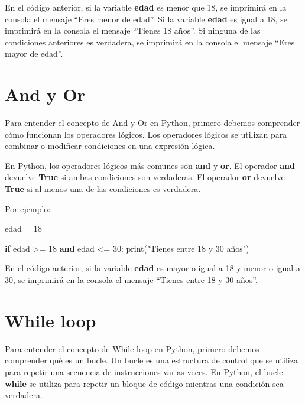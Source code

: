 \documentclass[
  a4paper,
  DIV=11,
  numbers=noendperiod,
  onepage,
  openany]{scrreprt}
\newenvironment{Shaded}{\begin{snugshade}}{\end{snugshade}}
\newcommand{\BuiltInTok}[1]{\textcolor[rgb]{0.00,0.23,0.31}{#1}}
\newcommand{\ControlFlowTok}[1]{\textcolor[rgb]{0.00,0.23,0.31}{\textbf{#1}}}
\newcommand{\DecValTok}[1]{\textcolor[rgb]{0.68,0.00,0.00}{#1}}
\newcommand{\KeywordTok}[1]{\textcolor[rgb]{0.00,0.23,0.31}{\textbf{#1}}}
\newcommand{\NormalTok}[1]{\textcolor[rgb]{0.00,0.23,0.31}{#1}}
\newcommand{\OperatorTok}[1]{\textcolor[rgb]{0.37,0.37,0.37}{#1}}
\newcommand{\StringTok}[1]{\textcolor[rgb]{0.13,0.47,0.30}{#1}}
\begin{document}
En el código anterior, si la variable \textbf{edad} es menor que 18, se
imprimirá en la consola el mensaje ``Eres menor de edad''. Si la
variable \textbf{edad} es igual a 18, se imprimirá en la consola el
mensaje ``Tienes 18 años''. Si ninguna de las condiciones anteriores es
verdadera, se imprimirá en la consola el mensaje ``Eres mayor de edad''.

\section{And y Or}\label{and-y-or}

Para entender el concepto de And y Or en Python, primero debemos
comprender cómo funcionan los operadores lógicos. Los operadores lógicos
se utilizan para combinar o modificar condiciones en una expresión
lógica.

En Python, los operadores lógicos más comunes son \textbf{and} y
\textbf{or}. El operador \textbf{and} devuelve \textbf{True} si ambas
condiciones son verdaderas. El operador \textbf{or} devuelve
\textbf{True} si al menos una de las condiciones es verdadera.

Por ejemplo:

\begin{Shaded}
\begin{Highlighting}[]
\NormalTok{edad }\OperatorTok{=} \DecValTok{18}

\ControlFlowTok{if}\NormalTok{ edad }\OperatorTok{\textgreater{}=} \DecValTok{18} \KeywordTok{and}\NormalTok{ edad }\OperatorTok{\textless{}=} \DecValTok{30}\NormalTok{:}
    \BuiltInTok{print}\NormalTok{(}\StringTok{"Tienes entre 18 y 30 años"}\NormalTok{)}
\end{Highlighting}
\end{Shaded}

En el código anterior, si la variable \textbf{edad} es mayor o igual a
18 y menor o igual a 30, se imprimirá en la consola el mensaje ``Tienes
entre 18 y 30 años''.

\section{While loop}\label{while-loop}

Para entender el concepto de While loop en Python, primero debemos
comprender qué es un bucle. Un bucle es una estructura de control que se
utiliza para repetir una secuencia de instrucciones varias veces. En
Python, el bucle \textbf{while} se utiliza para repetir un bloque de
código mientras una condición sea verdadera.
\end{document}
